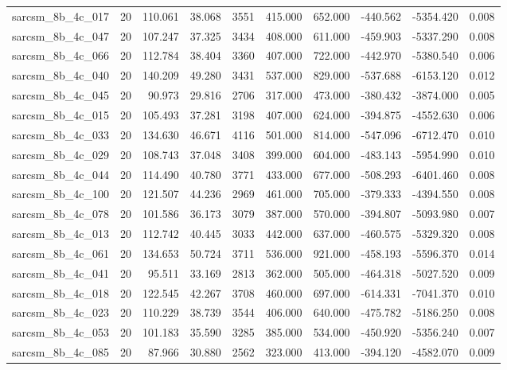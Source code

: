 \begin{tabular}{lrrrrrrrrr}
sarcsm\_8b\_4c\_017 & 20 & 110.061 & 38.068 & 3551 & 415.000 & 652.000 & -440.562 & -5354.420 & 0.008 \\
sarcsm\_8b\_4c\_047 & 20 & 107.247 & 37.325 & 3434 & 408.000 & 611.000 & -459.903 & -5337.290 & 0.008 \\
sarcsm\_8b\_4c\_066 & 20 & 112.784 & 38.404 & 3360 & 407.000 & 722.000 & -442.970 & -5380.540 & 0.006 \\
sarcsm\_8b\_4c\_040 & 20 & 140.209 & 49.280 & 3431 & 537.000 & 829.000 & -537.688 & -6153.120 & 0.012 \\
sarcsm\_8b\_4c\_045 & 20 & 90.973 & 29.816 & 2706 & 317.000 & 473.000 & -380.432 & -3874.000 & 0.005 \\
sarcsm\_8b\_4c\_015 & 20 & 105.493 & 37.281 & 3198 & 407.000 & 624.000 & -394.875 & -4552.630 & 0.006 \\
sarcsm\_8b\_4c\_033 & 20 & 134.630 & 46.671 & 4116 & 501.000 & 814.000 & -547.096 & -6712.470 & 0.010 \\
sarcsm\_8b\_4c\_029 & 20 & 108.743 & 37.048 & 3408 & 399.000 & 604.000 & -483.143 & -5954.990 & 0.010 \\
sarcsm\_8b\_4c\_044 & 20 & 114.490 & 40.780 & 3771 & 433.000 & 677.000 & -508.293 & -6401.460 & 0.008 \\
sarcsm\_8b\_4c\_100 & 20 & 121.507 & 44.236 & 2969 & 461.000 & 705.000 & -379.333 & -4394.550 & 0.008 \\
sarcsm\_8b\_4c\_078 & 20 & 101.586 & 36.173 & 3079 & 387.000 & 570.000 & -394.807 & -5093.980 & 0.007 \\
sarcsm\_8b\_4c\_013 & 20 & 112.742 & 40.445 & 3033 & 442.000 & 637.000 & -460.575 & -5329.320 & 0.008 \\
sarcsm\_8b\_4c\_061 & 20 & 134.653 & 50.724 & 3711 & 536.000 & 921.000 & -458.193 & -5596.370 & 0.014 \\
sarcsm\_8b\_4c\_041 & 20 & 95.511 & 33.169 & 2813 & 362.000 & 505.000 & -464.318 & -5027.520 & 0.009 \\
sarcsm\_8b\_4c\_018 & 20 & 122.545 & 42.267 & 3708 & 460.000 & 697.000 & -614.331 & -7041.370 & 0.010 \\
sarcsm\_8b\_4c\_023 & 20 & 110.229 & 38.739 & 3544 & 406.000 & 640.000 & -475.782 & -5186.250 & 0.008 \\
sarcsm\_8b\_4c\_053 & 20 & 101.183 & 35.590 & 3285 & 385.000 & 534.000 & -450.920 & -5356.240 & 0.007 \\
sarcsm\_8b\_4c\_085 & 20 & 87.966 & 30.880 & 2562 & 323.000 & 413.000 & -394.120 & -4582.070 & 0.009 \\

\end{tabular}
